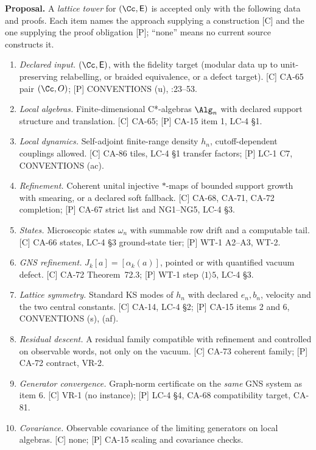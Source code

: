 \textbf{Proposal.}  A \emph{lattice tower} for \((\Cc,\mathsf E)\) is
accepted only with the following data and proofs.  Each item names the
approach supplying a construction [C] and the one supplying the proof
obligation [P]; ``none'' means no current source constructs it.
\begin{enumerate}
\item \emph{Declared input.}  \((\Cc,\mathsf E)\), with the fidelity target
(modular data up to unit-preserving relabelling, or braided equivalence, or
a defect target).  [C] CA-65 pair \((\Cc,O)\); [P] CONVENTIONS (u),
:23--53.
\item \emph{Local algebras.}  Finite-dimensional C*-algebras \(\Alg_n\) with
declared support structure and translation.  [C] CA-65; [P] CA-15 item 1,
LC-4 \S1.
\item \emph{Local dynamics.}  Self-adjoint finite-range density \(h_n\),
cutoff-dependent couplings allowed.  [C] CA-86 tiles, LC-4 \S1 transfer
factors; [P] LC-1 C7, CONVENTIONS (ac).
\item \emph{Refinement.}  Coherent unital injective \(*\)-maps of bounded
support growth with smearing, or a declared soft fallback.  [C] CA-68,
CA-71, CA-72 completion; [P] CA-67 strict list and NG1--NG5, LC-4 \S3.
\item \emph{States.}  Microscopic states \(\omega_n\) with summable row
drift and a computable tail.  [C] CA-66 states, LC-4 \S3 ground-state
tier; [P] WT-1 A2--A3, WT-2.
\item \emph{GNS refinement.}  \(J_k[a]=[\alpha_k(a)]\), pointed or with
quantified vacuum defect.  [C] CA-72 Theorem~72.3; [P] WT-1 step
\(\langle1\rangle5\), LC-4 \S3.
\item \emph{Lattice symmetry.}  Standard KS modes of \(h_n\) with declared
\(e_n,b_n\), velocity and the two central constants.  [C] CA-14, LC-4 \S2;
[P] CA-15 items 2 and 6, CONVENTIONS (s), (af).
\item \emph{Residual descent.}  A residual family compatible with
refinement and controlled on observable words, not only on the vacuum.
[C] CA-73 coherent family; [P] CA-72 contract, VR-2.
\item \emph{Generator convergence.}  Graph-norm certificate on the
\emph{same} GNS system as item 6.  [C] VR-1 (no instance); [P] LC-4 \S4,
CA-68 compatibility target, CA-81.
\item \emph{Covariance.}  Observable covariance of the limiting generators
on local algebras.  [C] none; [P] CA-15 scaling and covariance checks.

\end{enumerate}
